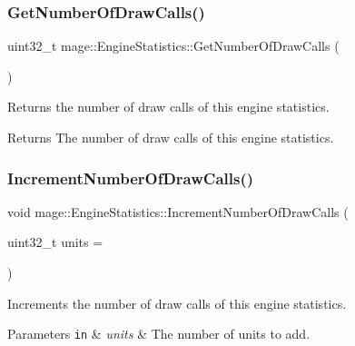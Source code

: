 \subsubsection{\texorpdfstring{Get\+Number\+Of\+Draw\+Calls()}{GetNumberOfDrawCalls()}}
{\footnotesize\ttfamily uint32\+\_\+t mage\+::\+Engine\+Statistics\+::\+Get\+Number\+Of\+Draw\+Calls (\begin{DoxyParamCaption}{ }\end{DoxyParamCaption})\hspace{0.3cm}{\ttfamily [noexcept]}}

Returns the number of draw calls of this engine statistics.

\begin{DoxyReturn}{Returns}
The number of draw calls of this engine statistics. 
\end{DoxyReturn}
\hypertarget{structmage_1_1_engine_statistics_a2516bf8b3ee2b652ff34de0f36956809}{}\label{structmage_1_1_engine_statistics_a2516bf8b3ee2b652ff34de0f36956809} 
\subsubsection{\texorpdfstring{Increment\+Number\+Of\+Draw\+Calls()}{IncrementNumberOfDrawCalls()}}
{\footnotesize\ttfamily void mage\+::\+Engine\+Statistics\+::\+Increment\+Number\+Of\+Draw\+Calls (\begin{DoxyParamCaption}\item[{uint32\+\_\+t}]{units = {} }\end{DoxyParamCaption})\hspace{0.3cm}{\ttfamily [noexcept]}}

Increments the number of draw calls of this engine statistics.


\begin{DoxyParams}[1]{Parameters}
\mbox{\tt in}  & {\em units} & The number of units to add. \\
\hline
\end{DoxyParams}
\hypertarget{structmage_1_1_engine_statistics_a6c5e8b9a5806e67f6f93a3c558293249}{}\label{structmage_1_1_engine_statistics_a6c5e8b9a5806e67f6f93a3c558293249} 
